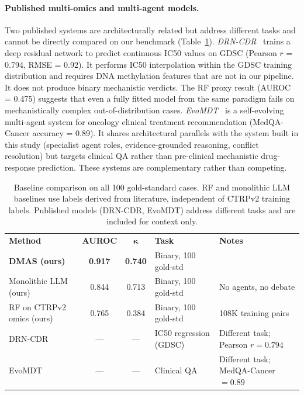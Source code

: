 \documentclass{article}
\begin{document}
\paragraph{Published multi-omics and multi-agent models.}
Two published systems are architecturally related but address different tasks and cannot be directly compared on our benchmark (Table~\ref{tab:baseline-comparison}).
\textit{DRN-CDR}~\cite{saranya2024drn} trains a deep residual network to predict continuous IC50 values on GDSC (Pearson $r$ = 0.794, RMSE = 0.92). It performs IC50 interpolation within the GDSC training distribution and requires DNA methylation features that are not in our pipeline. It does not produce binary mechanistic verdicts. The RF proxy result (AUROC = 0.475) suggests that even a fully fitted model from the same paradigm fails on mechanistically complex out-of-distribution cases.
\textit{EvoMDT}~\cite{liu2026evomdt} is a self-evolving multi-agent system for oncology clinical treatment recommendation (MedQA-Cancer accuracy = 0.89). It shares architectural parallels with the system built in this study (specialist agent roles, evidence-grounded reasoning, conflict resolution) but targets clinical QA rather than pre-clinical mechanistic drug-response prediction. These systems are complementary rather than competing.

\begin{table}[H]
\centering
\caption{Baseline comparison on all 100 gold-standard cases. RF and monolithic LLM baselines use labels derived from literature, independent of CTRPv2 training labels. Published models (DRN-CDR, EvoMDT) address different tasks and are included for context only.}
\label{tab:baseline-comparison}
\small
\renewcommand{\arraystretch}{1.35}
\begin{tabularx}{\textwidth}{@{}
    >{\raggedright\arraybackslash}p{}
    cc
    >{\raggedright\arraybackslash}p{}
    >{\raggedright\arraybackslash}X@{}}
\rowcolor{headerblue}
\color{white}\textbf{Method} &
\color{white}\textbf{AUROC} &
\color{white}\textbf{$\boldsymbol{\kappa}$} &
\color{white}\textbf{Task} &
\color{white}\textbf{Notes} \\

\rowcolor{rowgray}
\textbf{DMAS (ours)} & \textbf{0.917} & \textbf{0.740} & Binary, 100 gold-std & \\ \hline

Monolithic LLM (ours) & 0.844 & 0.713 & Binary, 100 gold-std & No agents, no debate \\ \hline

\rowcolor{rowgray}
RF on CTRPv2 omics (ours) & 0.765 & 0.384 & Binary, 100 gold-std & 108K training pairs \\ \hline

DRN-CDR~\cite{saranya2024drn} & --- & --- & IC50 regression (GDSC) & Different task; Pearson $r=0.794$ \\ \hline

\rowcolor{rowgray}
EvoMDT~\cite{liu2026evomdt} & --- & --- & Clinical QA & Different task; MedQA-Cancer $=0.89$ \\ \hline
\end{tabularx}
\end{table}
\end{document}

